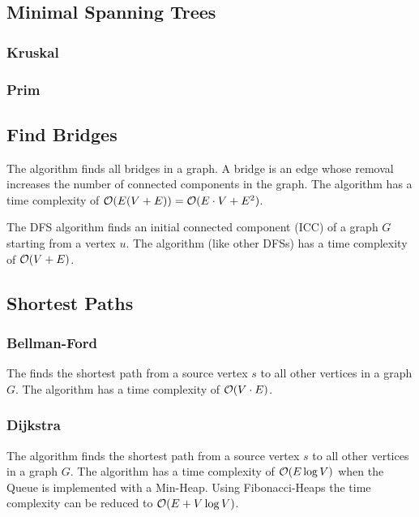 \documentclass{article}
\begin{document}
\subsection{Minimal Spanning Trees}
\subsubsection{Kruskal}


\subsubsection{Prim}


\subsection{Find Bridges}
The  algorithm finds all bridges in a graph. A bridge is an edge whose removal increases the number of connected components in the graph. The algorithm has a time complexity of $\mathcal{O}(E(V+E))=\mathcal{O}(E\cdot V+E^2)$.\par

The DFS algorithm  finds an initial connected component (ICC) of a graph $G$ starting from a vertex $u$. The algorithm (like other DFSs) has a time complexity of $\mathcal{O}(V+E)$.\par


\subsection{Shortest Paths}


\subsubsection{Bellman-Ford}
The  finds the shortest path from a source vertex $s$ to all other vertices in a graph $G$. The algorithm has a time complexity of $\mathcal{O}(V\cdot E)$.\par


\subsubsection{Dijkstra}
The  algorithm finds the shortest path from a source vertex $s$ to all other vertices in a graph $G$. The algorithm has a time complexity of $\mathcal{O}(E\log V)$ when the Queue is implemented with a Min-Heap. Using Fibonacci-Heaps the time complexity can be reduced to $\mathcal{O}(E+V\log V)$.\par

\end{document}

